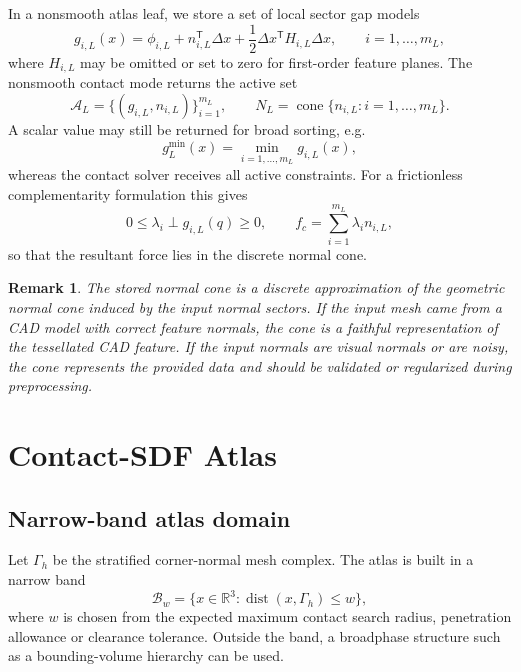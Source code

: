 \documentclass[preprint,12pt,sort&compress]{elsarticle}
\newtheorem{remark}{Remark}
\newcommand{\R}{\mathbb{R}}
\newcommand{\dist}{\operatorname{dist}}
\newcommand{\cone}{\operatorname{cone}}
\newcommand{\T}{\mathsf{T}}
\newcommand{\cA}{\mathcal{A}}
\newcommand{\cB}{\mathcal{B}}
\begin{document}
In a nonsmooth atlas leaf, we store a set of local sector gap models
\begin{equation}
 g_{i,L}(x)=\phi_{i,L}+n_{i,L}^\T\Delta x + \frac{1}{2}\Delta x^\T H_{i,L}\Delta x,
 \qquad i=1,\ldots,m_L,
\label{eq:sector_gap_model}
\end{equation}
where $H_{i,L}$ may be omitted or set to zero for first-order feature planes. The nonsmooth contact mode returns the active set
\begin{equation}
 \cA_L=\{(g_{i,L},n_{i,L})\}_{i=1}^{m_L}, \qquad N_L=\cone\{n_{i,L}:i=1,\ldots,m_L\}.
\label{eq:active_set_record}
\end{equation}
A scalar value may still be returned for broad sorting, e.g.
\begin{equation}
 g_L^{\min}(x)=\min_{i=1,\ldots,m_L} g_{i,L}(x),
\end{equation}
whereas the contact solver receives all active constraints. For a frictionless complementarity formulation this gives
\begin{equation}
 0\leq \lambda_i \perp g_{i,L}(q)\geq 0, \qquad
 f_c = \sum_{i=1}^{m_L}\lambda_i n_{i,L},
\label{eq:multi_complementarity}
\end{equation}
so that the resultant force lies in the discrete normal cone.

\begin{remark}
The stored normal cone is a discrete approximation of the geometric normal cone induced by the input normal sectors. If the input mesh came from a CAD model with correct feature normals, the cone is a faithful representation of the tessellated CAD feature. If the input normals are visual normals or are noisy, the cone represents the provided data and should be validated or regularized during preprocessing.
\end{remark}

\section{Contact-SDF Atlas}
\label{sec:atlas}

\subsection{Narrow-band atlas domain}

Let $\Gamma_h$ be the stratified corner-normal mesh complex. The atlas is built in a narrow band
\begin{equation}
 \cB_w = \{x\in\R^3: \dist(x,\Gamma_h)\leq w\},
\end{equation}
where $w$ is chosen from the expected maximum contact search radius, penetration allowance or clearance tolerance. Outside the band, a broadphase structure such as a bounding-volume hierarchy can be used.
\end{document}
